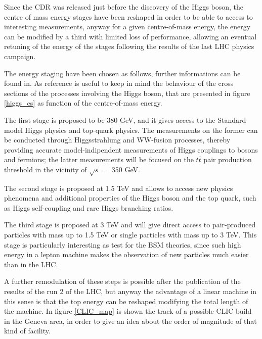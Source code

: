Since the CDR\cite{CLIC:cdr} was released just before the discovery of the Higgs boson, the centre of mass energy stages have been reshaped in order to be able to access to interesting measurements, anyway for a given centre-of-mass energy, the energy can be modified by a third with limited loss of performance\cite{CLIC:cdrVol3}, allowing an eventual retuning of the energy of the stages following the results of the last LHC physics campaign.

The energy staging have been chosen as follows, further informations can be found in\cite{CLIC:staging2016,Bozovic-Jelisavcic:2160172}. As reference is useful to keep in mind the behaviour of the cross sections of the processes involving the Higgs boson, that are presented in figure \ref{higgs_cs} as function of the centre-of-mass energy.

The first stage is proposed to be 380 GeV, and it gives access to the Standard model Higgs physics and top-quark physics. The measurements on the former can be conducted through Higgsstrahlung and WW-fusion processes, thereby providing accurate model-indipendent measurements of Higgs couplings to bosons and fermions\cite{Roloff:2210491}; the latter measurements will be focused on the $t\bar{t}$ pair production threshold in the vicinity of $\sqrt{s} = $ 350 GeV.

The second stage is proposed at 1.5 TeV and allows to access new physics phenomena and additional properties of the Higgs boson and the top quark, such as Higgs self-coupling and rare Higgs branching ratios.

The third stage is proposed at 3 TeV and will give direct access to pair-produced particles with mass up to 1.5 TeV or single particles with mass up to 3 TeV. This stage is particularly interesting as test for the BSM theories, since such high energy in a lepton machine makes the observation of new particles much easier than in the LHC.

A further remodulation of these steps is possible after the publication of the results of the run 2 of the LHC, but anyway the advantage of a linear machine in this sense is that the top energy can be reshaped modifying the total length of the machine. In figure \ref{CLIC_map} is shown the track of a possible CLIC build in the Geneva area, in order to give an idea about the order of magnitude of that kind of facility.

